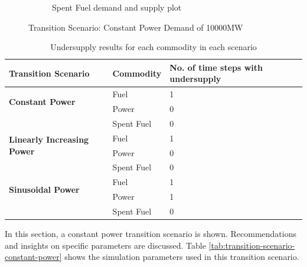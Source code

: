 \documentclass{anstrans}
\begin{document}
\begin{figure}[!htbp]
\begin{subfigure}[t]{0.45\textwidth}
        \caption{Spent Fuel demand and supply plot}
        \label{fig:constanttransition-spentfuel}
    \end{subfigure}
    \caption{Transition Scenario: Constant Power Demand of 10000MW}
\end{figure}

\begin{table}[htb]
    \centering
    \caption {Undersupply results for each commodity in each scenario}
	\label{tab:transition-scenario-results}
    \begin{tabular}{|l|l|p{4.5cm}|}
    \hline
    \textbf{Transition Scenario}    & \textbf{Commodity}    & \textbf{No. of time steps with undersupply} \\ \hline
    \multirow{2}{*}{\textbf{Constant Power}} & Fuel & 1 \\ \cline{2-3}
                                             & Power & 0 \\ \cline{2-3}
                                             & Spent Fuel & 0 \\ \hline
    \multirow{2}{*}{\textbf{Linearly Increasing Power}} & Fuel & 1 \\ \cline{2-3}
                                             & Power & 0 \\ \cline{2-3}
                                             & Spent Fuel & 0 \\ \hline
    \multirow{2}{*}{\textbf{Sinusoidal Power}} & Fuel & 1 \\ \cline{2-3}
                                             & Power & 1 \\ \cline{2-3}
                                             & Spent Fuel & 0 \\ \hline
    \end{tabular}
\end{table}

In this section, a constant power transition scenario is shown. 
Recommendations and insights on specific parameters are 
discussed. 
Table \ref{tab:transition-scenario-constant-power} shows the 
simulation parameters used in this transition scenario. 
\end{document}

